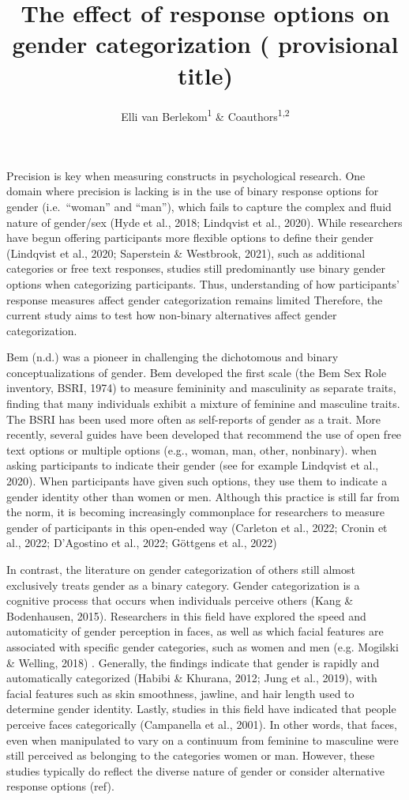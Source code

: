 \documentclass[
  man]{apa7}
\title{The effect of response options on gender categorization ( provisional title)}
\author{Elli van Berlekom\textsuperscript{1} \& Coauthors\textsuperscript{1,2}}
\date{}
\affiliation{\vspace{0.5cm}\textsuperscript{1} Stockholm University\\\textsuperscript{2} Lund University}
\begin{document}
\maketitle

Precision is key when measuring constructs in psychological research. One domain where precision is lacking is in the use of binary response options for gender (i.e.~``woman'' and ``man''), which fails to capture the complex and fluid nature of gender/sex (Hyde et al., 2018; Lindqvist et al., 2020). While researchers have begun offering participants more flexible options to define their gender (Lindqvist et al., 2020; Saperstein \& Westbrook, 2021), such as additional categories or free text responses, studies still predominantly use binary gender options when categorizing participants. Thus, understanding of how participants' response measures affect gender categorization remains limited Therefore, the current study aims to test how non-binary alternatives affect gender categorization.

Bem (n.d.) was a pioneer in challenging the dichotomous and binary conceptualizations of gender. Bem developed the first scale (the Bem Sex Role inventory, BSRI, 1974) to measure femininity and masculinity as separate traits, finding that many individuals exhibit a mixture of feminine and masculine traits. The BSRI has been used more often as self-reports of gender as a trait. More recently, several guides have been developed that recommend the use of open free text options or multiple options (e.g., woman, man, other, nonbinary). when asking participants to indicate their gender (see for example Lindqvist et al., 2020). When participants have given such options, they use them to indicate a gender identity other than women or men. Although this practice is still far from the norm, it is becoming increasingly commonplace for researchers to measure gender of participants in this open-ended way (Carleton et al., 2022; Cronin et al., 2022; D'Agostino et al., 2022; Göttgens et al., 2022)

In contrast, the literature on gender categorization of others still almost exclusively treats gender as a binary category. Gender categorization is a cognitive process that occurs when individuals perceive others (Kang \& Bodenhausen, 2015). Researchers in this field have explored the speed and automaticity of gender perception in faces, as well as which facial features are associated with specific gender categories, such as women and men (e.g. Mogilski \& Welling, 2018) . Generally, the findings indicate that gender is rapidly and automatically categorized (Habibi \& Khurana, 2012; Jung et al., 2019), with facial features such as skin smoothness, jawline, and hair length used to determine gender identity. Lastly, studies in this field have indicated that people perceive faces categorically (Campanella et al., 2001). In other words, that faces, even when manipulated to vary on a continuum from feminine to masculine were still perceived as belonging to the categories women or man. However, these studies typically do reflect the diverse nature of gender or consider alternative response options (ref).
\end{document}
